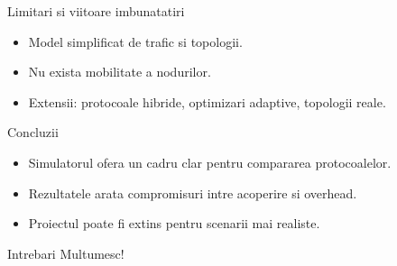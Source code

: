 \documentclass[aspectratio=169]{beamer}
\begin{document}
\begin{frame}{Limitari si viitoare imbunatatiri}
  \begin{itemize}
    \item Model simplificat de trafic si topologii.
    \item Nu exista mobilitate a nodurilor.
    \item Extensii: protocoale hibride, optimizari adaptive, topologii reale.
  \end{itemize}
\end{frame}

\begin{frame}{Concluzii}
  \begin{itemize}
    \item Simulatorul ofera un cadru clar pentru compararea protocoalelor.
    \item Rezultatele arata compromisuri intre acoperire si overhead.
    \item Proiectul poate fi extins pentru scenarii mai realiste.
  \end{itemize}
\end{frame}

\begin{frame}{Intrebari}
  \centering
  \Large Multumesc!
\end{frame}
\end{document}
